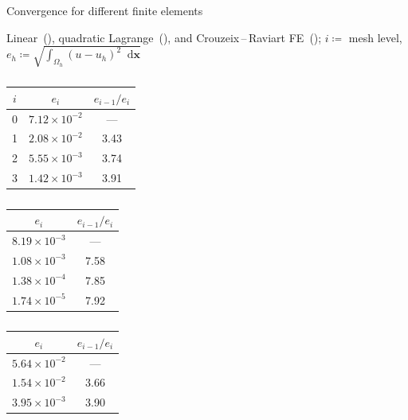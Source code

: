 \documentclass[svgnames]{beamer} %
\newcommand{\vect}[1]{\boldsymbol{\mathbf{#1}}}
\newcommand*\diff{\mathop{}\!\mathrm{d}}
\begin{document}
	\begin{frame}{Convergence for different finite elements}
		\begin{table}\centering
			\caption{
				Linear~(), quadratic Lagrange~(), and Crouzeix\,--\,Raviart FE~(); $i \coloneqq$ mesh level, $e_h \coloneqq \sqrt{\int_{\Omega_h} (u - u_h)^2 \diff{\vect x}}$
			} 
			\label{tab:divgrad_conv}
			\tiny
			\begin{subtable}[b]{.35\linewidth}
				\centering
				\begin{tabular}[.7]{ | c | c | c | }
					\hline
					$i$ & $e_i$ & $e_{i-1} / e_i$ \\
					\hline\hline
					0	& $7.12 \times 10^{-2}$ & --- \\
					\hline
					1	& $2.08 \times 10^{-2}$ & 3.43 \\
					\hline
					2	& $5.55 \times 10^{-3}$ & 3.74 \\
					\hline
					3	& $1.42 \times 10^{-3}$ & 3.91 \\
					\hline
				\end{tabular}
				\caption{}
				\label{tab:divgrad_conv:a}
			\end{subtable}%
			\begin{subtable}[b]{.3\linewidth}
				\centering
				\begin{tabular}[.7]{ | c | c | }
					\hline
					$e_i$ & $e_{i-1} / e_i$ \\
					\hline\hline
					$8.19 \times 10^{-3}$ & --- \\
					\hline
					$1.08 \times 10^{-3}$ & 7.58 \\
					\hline
					$1.38 \times 10^{-4}$ & 7.85 \\
					\hline
					$1.74 \times 10^{-5}$ & 7.92 \\
					\hline
				\end{tabular}
				\caption{}
				\label{tab:divgrad_conv:b}
			\end{subtable}%
			\begin{subtable}[b]{.3\linewidth}
				\centering
				\begin{tabular}[.7]{ | c | c | }
					\hline
					$e_i$ & $e_{i-1} / e_i$ \\
					\hline\hline
					$5.64 \times 10^{-2}$ & --- \\
					\hline
					$1.54 \times 10^{-2}$ & 3.66 \\
					\hline
					$3.95 \times 10^{-3}$ & 3.90 \\
					\hline

\end{tabular}
\end{subtable}
\end{table}
\end{frame}
\end{document}
